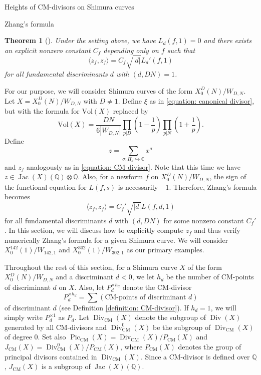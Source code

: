 \documentclass{amsart}
\newtheorem{theorem}{Theorem}
\theoremstyle{definition}
\def\C{\mathbb C}
\def\Q{\mathbb Q}
\def\gen#1{\langle #1\rangle}
\def\CM{\mathrm{CM}}
\def\Div{\operatorname{Div}}
\def\Pic{\operatorname{Pic}}
\def\Jac{\operatorname{Jac}}
\begin{document}
\begin{section}{Heights of CM-divisors on Shimura curves}
\begin{subsection}{Zhang's formula}
\begin{theorem}[\cite{Zhang}] Under the setting above, we have $L_d(f,1)=0$
  and there exists an explicit nonzero constant $C_f$ depending only
  on $f$ such that
  $$
    \gen{z_f,z_f}=C_f\sqrt{|d|}L_d'(f,1)
  $$
  for all fundamental discriminants $d$ with $(d,DN)=1$.
\end{theorem}

For our purpose, we will consider Shimura curves of the form
$X_0^D(N)/W_{D,N}$.
Let $X=X_0^D(N)/W_{D,N}$ with $D\neq 1$. Define $\xi$ as in
\eqref{equation: canonical divisor}, but with the formula for
$\mathrm{Vol}(X)$ replaced by
$$
  \mathrm{Vol}(X)=\frac{DN}{6|W_{D,N}|}\prod_{p|D}
  \left(1-\frac1p\right)\prod_{p|N}\left(1+\frac1p\right).
$$
Define
$$
  z=\sum_{\sigma: H_d\hookrightarrow\C} x^\sigma
$$
and $z_f$ analogously as in \eqref{equation: CM divisor}. Note that
this time we have $z\in\Jac(X)(\Q)\otimes\Q$. Also, for a newform $f$
on $X_0^D(N)/W_{D,N}$, the sign of the functional equation for
$L(f,s)$ is necessarily $-1$. Therefore, Zhang's formula becomes
$$
  \gen{z_f,z_f}=C_f'\sqrt{|d|}L(f,d,1)
$$
for all fundamental discriminants $d$ with $(d,DN)$ for some nonzero
constant $C_f'$. In this section, we will discuss how to explicitly
compute $z_f$ and thus verify numerically Zhang's formula for a given
Shimura curve. We will consider $X_0^{142}(1)/W_{142,1}$ and
$X_0^{302}(1)/W_{302,1}$ as our primary examples.

Throughout the rest of this section, for a Shimura curve $X$ of the
form $X_0^D(N)/W_{D,N}$ and a discriminant $d<0$, we let $h_d$ be
the number of CM-points of discriminant $d$ on $X$. Also, let
$P_d^{\times h_d}$ denote the CM-divisor
$$
  P_d^{\times h_d}=\sum(\text{CM-points of discriminant }d)
$$
of discriminant $d$ (see Definition \ref{definition: CM-divisor}).
If $h_d=1$, we will simply write $P_d^{\times 1}$ as $P_d$. Let
$\Div_\CM(X)$ denote the subgroup of $\Div(X)$ generated
by all CM-divisors and $\Div_\CM^0(X)$ be the
subgroup of $\Div_\CM(X)$ of degree $0$. Set also
$\Pic_\CM(X)=\Div_\CM(X)/P_\CM(X)$ and
$J_\CM(X)=\Div_\CM^0(X)/P_\CM(X)$, where $P_\CM(X)$
denotes the group of principal divisors contained in $\Div_\CM(X)$.
Since a CM-divisor is defined over $\Q$, $J_\CM(X)$ is a subgroup of
$\Jac(X)(\Q)$.


\end{subsection}
\end{section}
\end{document}
